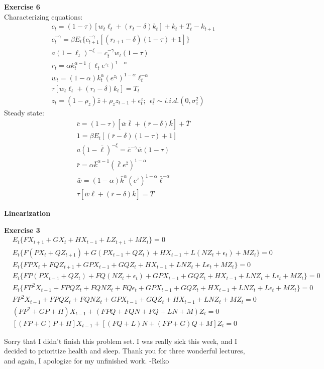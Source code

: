 \documentclass[letterpaper,12pt]{article}
\theoremstyle{definition}
\begin{document}
\textbf{Exercise 6} \\
Characterizing equations:
\begin{align*}
  &c_t = (1-\tau) [w_t\ell_t+(r_t-\delta)k_t]+k_t+T_t-k_{t+1}
  \\
  &c_t^{-\gamma} = \beta E_t\{c_{t+1}^{-\gamma}[(r_{t+1}-\delta)(1-\tau)+1]\}
  \\
  &a(1-\ell_t)^{-\xi} = c_t^{-\gamma}w_t(1-\tau)
  \\
  &r_t = \alpha k_t^{\alpha-1} (\ell_t e^{z_t})^{1-\alpha}
  \\
  &w_t = (1-\alpha)k_t^{\alpha}(e^{z_t})^{1-\alpha}\ell_t^{-\alpha}
  \\
  &\tau[w_t\ell_t+(r_t-\delta)k_t] = T_t
  \\
  &z_t = (1-\rho_z)\bar{z}+\rho_zz_{t-1}+\epsilon_t^z; \ \ \epsilon_t^z \sim i.i.d.(0, \sigma_z^2)
\end{align*}
Steady state:
\begin{align*}
  &\bar{c} = (1-\tau) [\bar{w}\bar{\ell}+(\bar{r}-\delta)\bar{k}]+\bar{T}
  \\
  &1 = \beta E_t[(\bar{r}-\delta)(1-\tau)+1]
  \\
  &a(1-\bar{\ell})^{-\xi} = \bar{c}^{-\gamma}\bar{w}(1-\tau)
  \\
  &\bar{r} = \alpha \bar{k}^{\alpha-1} (\bar{\ell} e^{\bar{z}})^{1-\alpha}
  \\
  &\bar{w} = (1-\alpha)\bar{k}^{\alpha}(e^{\bar{z}})^{1-\alpha}\bar{\ell}^{-\alpha}
  \\
  &\tau[\bar{w}\bar{\ell}+(\bar{r}-\delta)\bar{k}] = \bar{T}
\end{align*}

\textbf{\large{Linearization}}

\textbf{Exercise 3}
\begin{align*}
  &E_t\{FX_{t+1}+G{X_t}+HX_{t-1}+LZ_{t+1}+MZ_t\}=0
  \\
  &E_t\{F(PX_t+QZ_{t+1})+G(PX_{t-1}+QZ_t)+HX_{t-1}+L(NZ_t+\epsilon_t)+MZ_t\}=0
  \\
  &E_t\{FPX_t+FQZ_{t+1}+GPX_{t-1}+GQZ_t+HX_{t-1}+LNZ_t+L\epsilon_t+MZ_t\}=0
  \\
  &E_t\{FP(PX_{t-1}+QZ_t)+FQ(NZ_t+\epsilon_t)+GPX_{t-1}+GQZ_t+HX_{t-1}+LNZ_t+L\epsilon_t+MZ_t\}=0
  \\
  &E_t\{FP^2X_{t-1}+FPQZ_t+FQNZ_t+FQ\epsilon_t+GPX_{t-1}+GQZ_t+HX_{t-1}+LNZ_t+L\epsilon_t+MZ_t\}=0
  \\
  &FP^2X_{t-1}+FPQZ_t+FQNZ_t+GPX_{t-1}+GQZ_t+HX_{t-1}+LNZ_t+MZ_t=0
  \\
  &(FP^2+GP+H)X_{t-1}+(FPQ+FQN+FQ+LN+M)Z_t=0
  \\
  &[(FP+G)P+H]X_{t-1}+[(FQ+L)N+(FP+G)Q+M]Z_t=0
\end{align*}

\vspace*{\fill}

Sorry that I didn't finish this problem set. I was really sick this week, and I decided to prioritize health and sleep. Thank you for three wonderful lectures, and again, I apologize for my unfinished work. \quad -Reiko
\end{document}
